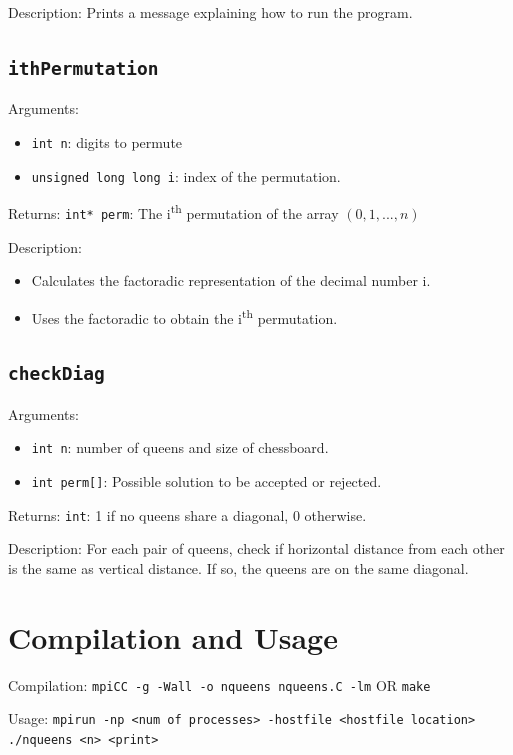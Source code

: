 \documentclass{article}
\begin{document}
\medskip
\noindent
Description: Prints a message explaining how to run the program.

\subsection{\texttt{ithPermutation}}
Arguments: 
    \begin{itemize}
	    \item \texttt{int n}: digits to permute
	    
	    \item \texttt{unsigned long long i}: index of the permutation.
    \end{itemize}
Returns: \texttt{int* perm}: The i\textsuperscript{th} permutation of the array 
$(0, 1, ..., n)$ 

\medskip
\noindent
Description: 
\begin{itemize}
    \item Calculates the factoradic representation of the decimal number i.

    \item Uses the factoradic to obtain the i\textsuperscript{th} permutation.
\end{itemize}

\subsection{\texttt{checkDiag}}
Arguments: 
    \begin{itemize}
	    \item \texttt{int n}: number of queens and size of chessboard.
	    
	    \item \texttt{int perm[]}: Possible solution to be accepted or rejected.
    \end{itemize}
Returns: \texttt{int}: 1 if no queens share a diagonal, 0 otherwise.

\medskip
\noindent
Description: For each pair of queens, check if horizontal distance from each 
other is the same as vertical distance. If so, the queens are on the same 
diagonal.

\section{Compilation and Usage}
Compilation: \texttt{mpiCC -g -Wall -o nqueens nqueens.C -lm} OR \texttt{make} 

\noindent
Usage: \texttt{mpirun -np <num of processes> -hostfile <hostfile location> 
./nqueens <n> <print>}
\end{document}
